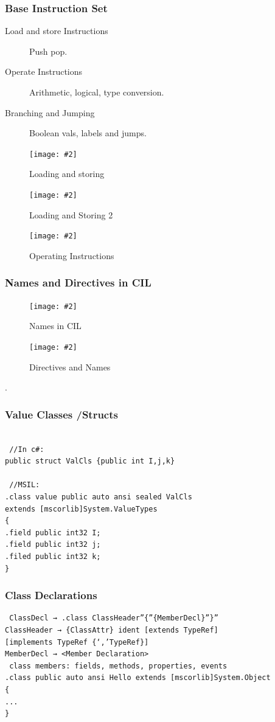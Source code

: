 \documentclass[a4paper,10pt]{scrartcl}
\newcommand{\pic}[2][Figure]{
  \begin{figure}[h!]
   \centering
   \texttt{[image: \#2]}
   \caption{{#1}}
  \end{figure}
}
\begin{document}
\subsubsection{Base Instruction Set}
\begin{description}
 \item [Load and store Instructions] Push pop.
 \item [Operate Instructions] Arithmetic, logical, type conversion.
 \item [Branching and Jumping] Boolean vals, labels and jumps.
 
\end{description}

\pic[Loading and storing]{loadstore.png}
\pic[Loading and Storing 2]{loadstore2.png}
\pic[Operating Instructions]{opinst.png}

\subsubsection{Names and Directives in CIL}
\pic[Names in CIL]{cilnames.png}
\pic[Directives and Names]{cilnamedirective.png}.

\subsubsection{Value Classes /Structs}
\begin{lstlisting}
 
 //In c#:
public struct ValCls {public int I,j,k}

 //MSIL:
.class value public auto ansi sealed ValCls
extends [mscorlib]System.ValueTypes
{
.field public int32 I;
.field public int32 j;
.filed public int32 k;
}

\end{lstlisting}

\subsubsection{Class Declarations}
\begin{lstlisting}
 ClassDecl → .class ClassHeader”{”{MemberDecl}”}”
ClassHeader → {ClassAttr} ident [extends TypeRef]
[implements TypeRef {‘,’TypeRef}]
MemberDecl → <Member Declaration>
 class members: fields, methods, properties, events
.class public auto ansi Hello extends [mscorlib]System.Object
{
...
}

\end{lstlisting}
\end{document}

